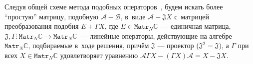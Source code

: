 Следуя общей схеме метода подобных операторов~\cite{baskakov-split},
будем искать более ``простую'' матрицу, подобную \( \mathcal{A} - \mathcal{B} \),
в~виде \( \mathcal{A} - \mathfrak{J} X \)
с~матрицей преобразования подобия \( E + \Gamma X \),
где \( E\in{\mathtt{Matr}_N\mathbb{C}} \)~--- единичная матрица,
\( \mathfrak{J},\Gamma : \mathtt{Matr}_N\mathbb{C}\to\mathtt{Matr}_N\mathbb{C} \)~--- линейные операторы,
действующие на алгебре \( \mathtt{Matr}_N\mathbb{C} \), подбираемые
в~ходе решения,
      прич\"ем \( \mathfrak{J} \) --- проектор (\(\mathfrak{J}^2=\mathfrak{J}\)),
      а \( \Gamma \)
      при всех \( X\in {\mathtt{Matr}_N\mathbb{C}} \) %
      удовлетворяет уравнению
          \( \mathcal{A}\Gamma X - (\Gamma X) \mathcal{A} = X - \mathfrak{J}X. \)

